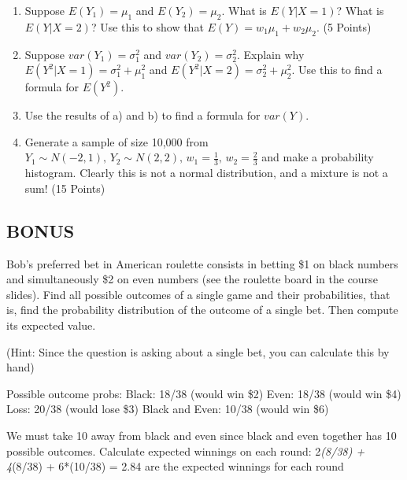 \documentclass[
]{article}
\begin{document}
\begin{enumerate}
\def\labelenumi{\arabic{enumi}.}
\item
  Suppose \(E(Y_1) = \mu_1\) and \(E(Y_2) = \mu_2\). What is
  \(E(Y|X = 1)\)? What is \(E(Y|X=2)\)? Use this to show that
  \(E(Y) = w_1 \mu_1 + w_2 \mu_2\). (5 Points)
\item
  Suppose \(var(Y_1) = \sigma_1^2\) and \(var(Y_2) = \sigma_2^2\).
  Explain why \(E(Y^2|X = 1) = \sigma_1^2 + \mu_1^2\) and
  \(E(Y^2|X=2) = \sigma_2^2 + \mu_2^2\). Use this to find a formula for
  \(E(Y^2)\).
\item
  Use the results of a) and b) to find a formula for \(var(Y)\).
\item
  Generate a sample of size 10,000 from
  \(Y_1 \sim N(-2,1), \, Y_2 \sim N(2,2), \, w_1 = \frac{1}{3}, \, w_2 = \frac{2}{3}\)
  and make a probability histogram. Clearly this is not a normal
  distribution, and a mixture is not a sum! (15 Points)
\end{enumerate}

\hypertarget{bonus}{%
\subsection{BONUS}\label{bonus}}

Bob's preferred bet in American roulette consists in betting \$1 on
black numbers and simultaneously \$2 on even numbers (see the roulette
board in the course slides). Find all possible outcomes of a single game
and their probabilities, that is, find the probability distribution of
the outcome of a single bet. Then compute its expected value.

(Hint: Since the question is asking about a single bet, you can
calculate this by hand)

Possible outcome probs: Black: 18/38 (would win \$2) Even: 18/38 (would
win \$4) Loss: 20/38 (would lose \$3) Black and Even: 10/38 (would win
\$6)

We must take 10 away from black and even since black and even together
has 10 possible outcomes. Calculate expected winnings on each round:
2\emph{(8/38) + 4}(8/38) + 6*(10/38) = 2.84 are the expected winnings
for each round
\end{document}
